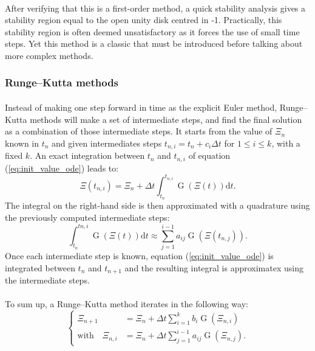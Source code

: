         \paragraph{}
        After verifying that this is a first-order method, a quick stability analysis gives a stability region equal to the open unity disk centred in -1.
        Practically, this stability region is often deemed unsatisfactory as it forces the use of small time steps.
        Yet this method is a classic that must be introduced before talking about more complex methods.


      \subsubsection{Runge--Kutta methods}

        \paragraph{}
        Instead of making one step forward in time as the explicit Euler method, Runge--Kutta methods will make a set of intermediate steps, and find the final solution as a combination of those intermediate steps.
        It starts from the value of $\Xi_n$ known in $t_n$ and given intermediates steps $t_{n, i} = t_n + c_i\Delta t$ for $1 \leq i \leq k$, with a fixed $k$.
        An exact integration between $t_n$ and $t_{n, i}$ of equation (\ref{eq:init_value_ode}) leads to:
        \begin{equation}
          \Xi\left(t_{n, i}\right) = \Xi_n + \Delta t \int_{t_n}^{t_{n,i}} \operatorname{G}\left(\Xi\left(t\right)\right) \mathrm{d}t .
        \end{equation}
        The integral on the right-hand side is then approximated with a quadrature using the previously computed intermediate steps:
        \begin{equation}
          \int_{t_n}^{t{n,i}} \operatorname{G}\left(\Xi\left(t\right)\right) \mathrm{d}t \approx \sum_{j = 1}^{i-1} a_{ij} \operatorname{G}\left(\Xi\left(t_{n,j}\right)\right) .
        \end{equation}
        Once each intermediate step is known, equation (\ref{eq:init_value_ode}) is integrated between $t_n$ and $t_{n+1}$ and the resulting integral is approximatex using the intermediate steps.

        \paragraph{}
        To sum up, a Runge--Kutta method iterates in the following way:
        \begin{equation}\label{eq:rk}
          \left\{\begin{aligned}
            \Xi_{n+1} &= \Xi_n + \Delta t \sum_{i = 1}^k b_i \operatorname{G}\left(\Xi_{n,i}\right) \\
            \textrm{with}\quad \Xi_{n,i} &= \Xi_n + \Delta t \sum_{j = 1}^{i-1} a_{ij} \operatorname{G}\left(\Xi_{n,j}\right) .
          \end{aligned}\right.
        \end{equation}

